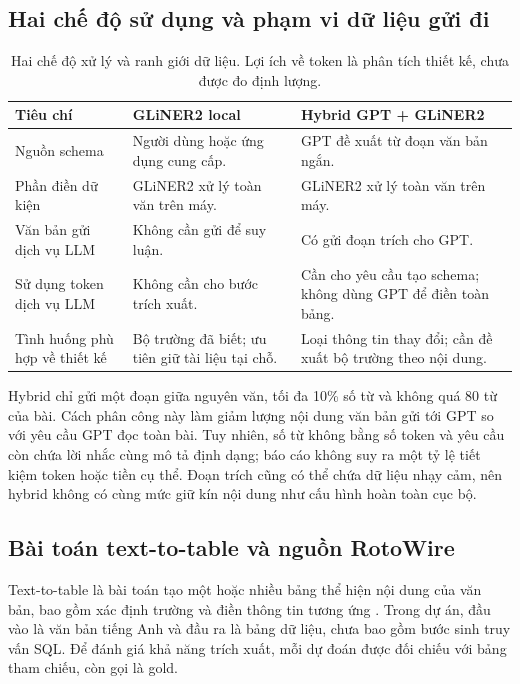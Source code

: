 \subsection{Hai chế độ sử dụng và phạm vi dữ liệu gửi đi}
\begin{table}[H]
\centering\small
\begin{tabularx}{\linewidth}{@{}p{3.15cm}Y Y@{}}
\toprule
\textbf{Tiêu chí} & \textbf{GLiNER2 local} & \textbf{Hybrid GPT + GLiNER2}\\\midrule
Nguồn schema & Người dùng hoặc ứng dụng cung cấp. & GPT đề xuất từ đoạn văn bản ngắn.\\
Phần điền dữ kiện & GLiNER2 xử lý toàn văn trên máy. & GLiNER2 xử lý toàn văn trên máy.\\
Văn bản gửi dịch vụ LLM & Không cần gửi để suy luận. & Có gửi đoạn trích cho GPT.\\
Sử dụng token dịch vụ LLM & Không cần cho bước trích xuất. & Cần cho yêu cầu tạo schema; không dùng GPT để điền toàn bảng.\\
Tình huống phù hợp về thiết kế & Bộ trường đã biết; ưu tiên giữ tài liệu tại chỗ. & Loại thông tin thay đổi; cần đề xuất bộ trường theo nội dung.\\
\bottomrule
\end{tabularx}
\caption{Hai chế độ xử lý và ranh giới dữ liệu. Lợi ích về token là phân tích thiết kế, chưa được đo định lượng.}
\label{tab:modes}
\end{table}

Hybrid chỉ gửi một đoạn giữa nguyên văn, tối đa 10\% số từ và không quá 80 từ của bài. Cách phân công này làm giảm lượng nội dung văn bản gửi tới GPT so với yêu cầu GPT đọc toàn bài. Tuy nhiên, số từ không bằng số token và yêu cầu còn chứa lời nhắc cùng mô tả định dạng; báo cáo không suy ra một tỷ lệ tiết kiệm token hoặc tiền cụ thể. Đoạn trích cũng có thể chứa dữ liệu nhạy cảm, nên hybrid không có cùng mức giữ kín nội dung như cấu hình hoàn toàn cục bộ.

\subsection{Bài toán text-to-table và nguồn RotoWire}
Text-to-table là bài toán tạo một hoặc nhiều bảng thể hiện nội dung của văn bản, bao gồm xác định trường và điền thông tin tương ứng \cite{t2t}. Trong dự án, đầu vào là văn bản tiếng Anh và đầu ra là bảng dữ liệu, chưa bao gồm bước sinh truy vấn SQL. Để đánh giá khả năng trích xuất, mỗi dự đoán được đối chiếu với bảng tham chiếu, còn gọi là gold.

